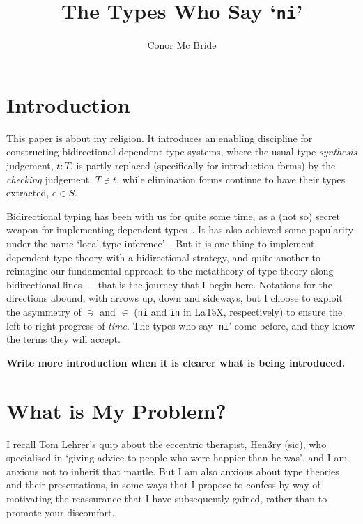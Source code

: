 \documentclass[format=acmsmall, screen, review, anonymous, timestamp]{acmart}
\newcommand{\bsl}{\texttt{\symbol{92}}}
\newcommand{\memo}[1]{\textbf{#1}}
\begin{document}
\title{The Types Who Say `\texttt{\bsl ni}'}
\author{Conor Mc Bride}
\maketitle


\section{Introduction}

This paper is about my religion. It introduces an enabling discipline
for constructing bidirectional dependent type systems, where the usual
type \emph{synthesis} judgement, $t : T$, is partly replaced
(specifically for introduction forms) by the \emph{checking}
judgement, $T \ni t$, while elimination forms continue to have their
types extracted, $e \in S$.

Bidirectional typing has been with us for quite some
time, as a (not so) secret weapon for implementing dependent
types~\cite{DBLP:journals/scp/Coquand96,DBLP:journals/corr/abs-1202-4905}.
It has also achieved some popularity under the name `local type
inference'~\cite{DBLP:journals/toplas/PierceT00}. But it is one thing
to implement dependent type theory with a bidirectional strategy, and
quite another to reimagine our fundamental approach to the metatheory
of type theory along bidirectional lines --- that is the journey that
I begin here. Notations for the directions abound, with arrows up,
down and sideways, but I choose to exploit the
asymmetry of $\ni$ and $\in$ ({\tt \bsl ni} and {\tt \bsl in} in
\LaTeX, respectively) to ensure the left-to-right progress of
\emph{time}. The types who say `\texttt{\bsl ni}' come before, and
they know the terms they will accept.

\memo{Write more introduction when it is clearer what is being introduced.}


\section{What is My Problem?}

I recall Tom Lehrer's quip about the eccentric therapist, Hen3ry
(sic), who specialised in `giving advice to people who were happier
than he was', and I am anxious not to inherit that mantle. But I am
also anxious about type theories and their presentations, in some ways
that I propose to confess by way of motivating the reassurance that I
have subsequently gained, rather than to promote your discomfort.
\end{document}
